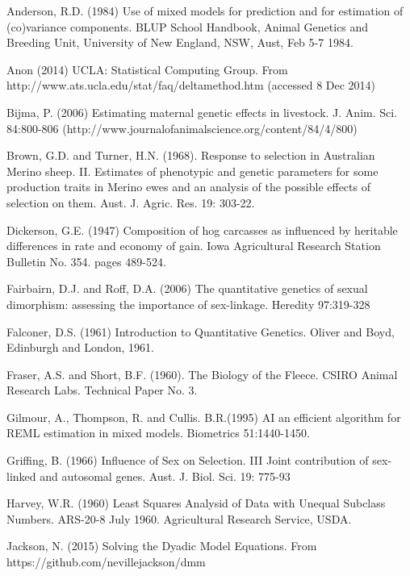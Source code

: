\documentclass[titlepage]{article}  %
\begin{document}
\clearpage
\begin{thebibliography}{99}

Anderson, R.D. (1984) Use of mixed models for prediction and for estimation 
    of (co)variance components. BLUP School Handbook, Animal Genetics and
    Breeding Unit, University of New England, NSW, Aust, Feb 5-7 1984.

Anon (2014) UCLA: Statistical Computing Group. 
    From http://www.ats.ucla.edu/stat/faq/deltamethod.htm (accessed 8 Dec 2014)

Bijma, P. (2006) Estimating maternal genetic effects in livestock.
    J. Anim. Sci. 84:800-806
    (http://www.journalofanimalscience.org/content/84/4/800)

Brown, G.D. and Turner, H.N. (1968).  Response to selection in Australian
    Merino sheep.  II. Estimates of phenotypic and genetic parameters for
    some production traits in Merino ewes and an analysis of the possible
    effects of selection on them.  Aust. J. Agric. Res. 19: 303-22.

Dickerson, G.E. (1947) Composition of hog carcasses as influenced by heritable
    differences in rate and economy of gain. Iowa Agricultural Research
    Station Bulletin No. 354. pages 489-524.

Fairbairn, D.J. and Roff, D.A. (2006) The quantitative genetics of sexual 
    dimorphism: assessing the importance of sex-linkage. Heredity 97:319-328

Falconer, D.S. (1961) Introduction to Quantitative Genetics.
    Oliver and Boyd, Edinburgh and London, 1961.

Fraser, A.S. and Short, B.F. (1960).  The Biology of the Fleece.  CSIRO
    Animal Research Labs.  Technical Paper No. 3.

Gilmour, A., Thompson, R. and Cullis. B.R.(1995) AI an efficient algorithm 
    for REML estimation in mixed models. Biometrics 51:1440-1450.

Griffing, B. (1966) Influence of Sex on Selection.
    III Joint contribution of sex-linked and autosomal genes.
    Aust. J. Biol. Sci. 19: 775-93
 
Harvey, W.R. (1960) Least Squares Analysid of Data with Unequal Subclass
    Numbers. ARS-20-8 July 1960. Agricultural Research Service, USDA.

Jackson, N. (2015) Solving the Dyadic Model Equations. 
    From https://github.com/nevillejackson/dmm


\end{thebibliography}
\end{document}
